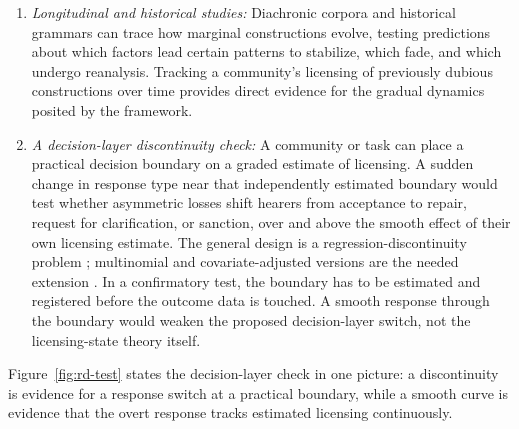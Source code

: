 \documentclass[12pt,letterpaper]{article}
\begin{document}
\begin{enumerate}
\item \emph{Longitudinal and historical studies:} Diachronic corpora and historical grammars can trace how marginal constructions evolve, testing predictions about which factors lead certain patterns to stabilize, which fade, and which undergo reanalysis. Tracking a community's licensing of previously dubious constructions over time provides direct evidence for the gradual dynamics posited by the framework.

\item \emph{A decision-layer discontinuity check:} A community or task can
place a practical decision boundary on a graded estimate of licensing. A sudden
change in response type near that independently estimated boundary would test
whether asymmetric losses shift hearers from acceptance to repair, request for
clarification, or sanction, over and above the smooth effect of their own
licensing estimate. The general design is a regression-discontinuity problem
\autocite{LeeLemieux2010,CalonicoCattaneoTitiunik2014}; multinomial and
covariate-adjusted versions are the needed extension \autocite{Lazzaro2026}. In
a confirmatory test, the boundary has to be estimated and registered before the
outcome data is touched. A smooth response through the boundary would weaken the proposed
decision-layer switch, not the licensing-state theory itself.
\end{enumerate}

Figure~\ref{fig:rd-test} states the decision-layer check in one picture: a
discontinuity is evidence for a response switch at a practical boundary, while
a smooth curve is evidence that the overt response tracks estimated licensing
continuously.
\end{document}
